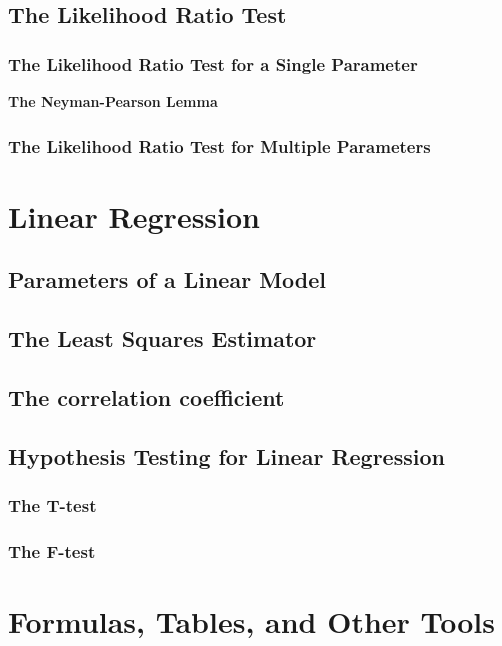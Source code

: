 \documentclass[sn-mathphys,Numbered]{sn-jnl}%
\begin{document}
\subsection{The Likelihood Ratio Test}\label{likelihood-ratio}
\subsubsection{The Likelihood Ratio Test for a Single Parameter}\label{single-param}
\textbf{The Neyman-Pearson Lemma}
\subsubsection{The Likelihood Ratio Test for Multiple Parameters}\label{multiple-param}

\section{Linear Regression}\label{linear-regression}
\subsection{Parameters of a Linear Model}\label{linear-model}
\subsection{The Least Squares Estimator}\label{least-squares}
\subsection{The correlation coefficient}\label{correlation}
\subsection{Hypothesis Testing for Linear Regression}\label{linear-hypothesis}
\subsubsection{The T-test}\label{regression-t-test}
\subsubsection{The F-test}\label{regression-f-test}

\newpage
\section*{Formulas, Tables, and Other Tools}\label{formulas-and-tables}
\end{document}
